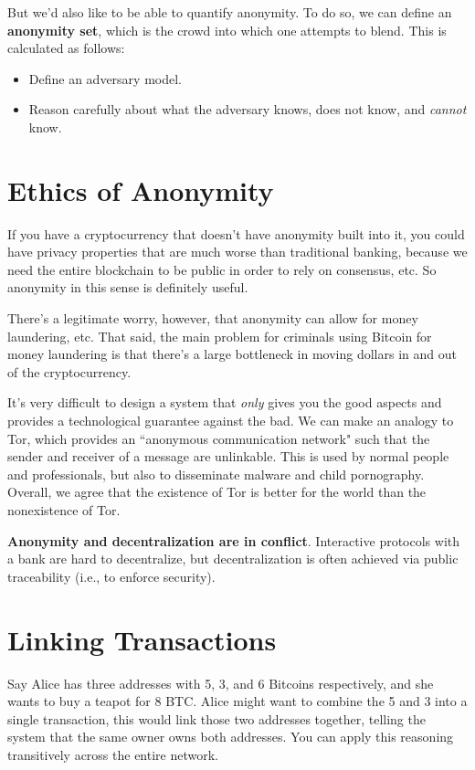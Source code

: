 \documentclass[12pt]{article}
\begin{document}
But we'd also like to be able to quantify anonymity. To do so, we can define an \textbf{anonymity set}, which is the crowd into which one attempts to blend. This is calculated as follows:
\begin{itemize}
\item Define an adversary model.
\item Reason carefully about what the adversary knows, does not know, and \textit{cannot} know.
\end{itemize}

\section*{Ethics of Anonymity}

If you have a cryptocurrency that doesn't have anonymity built into it, you could have privacy properties that are much worse than traditional banking, because we need the entire blockchain to be public in order to rely on consensus, etc. So anonymity in this sense is definitely useful.

There's a legitimate worry, however, that anonymity can allow for money laundering, etc. That said, the main problem for criminals using Bitcoin for money laundering is that there's a large bottleneck in moving dollars in and out of the cryptocurrency.

It's very difficult to design a system that \textit{only} gives you the good aspects and provides a technological guarantee against the bad. We can make an analogy to Tor, which provides an ``anonymous communication network" such that the sender and receiver of a message are unlinkable. This is used by normal people and professionals, but also to disseminate malware and child pornography. Overall, we agree that the existence of Tor is better for the world than the nonexistence of Tor.

\textbf{Anonymity and decentralization are in conflict}. Interactive protocols with a bank are hard to decentralize, but decentralization is often achieved via public traceability (i.e., to enforce security).

\section*{Linking Transactions}

Say Alice has three addresses with 5, 3, and 6 Bitcoins respectively, and she wants to buy a teapot for 8 BTC. Alice might want to combine the 5 and 3 into a single transaction, this would link those two addresses together, telling the system that the same owner owns both addresses. You can apply this reasoning transitively across the entire network.
\end{document}
